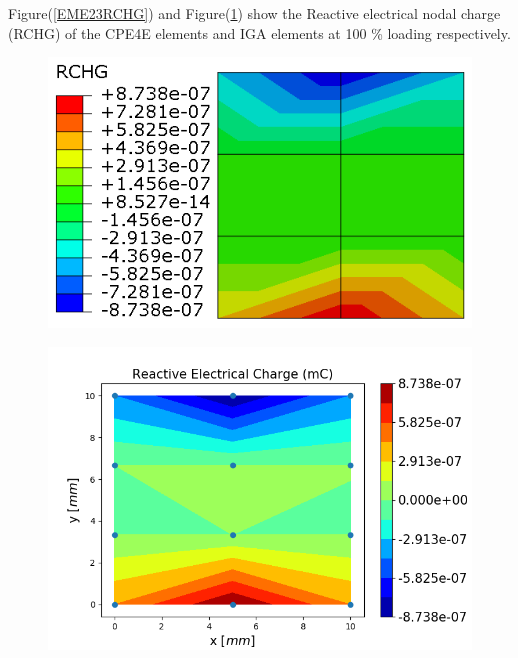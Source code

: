 \documentclass[12pt]{article}
\begin{document}
Figure(\ref{EME23RCHG}) and Figure(\ref{EME23RCHG_IGA}) show the Reactive electrical nodal charge (RCHG) of the CPE4E elements and IGA elements at 100 \% loading respectively. \\
\begin{figure}[H]
	\centering
	\begin{minipage}{.5\textwidth}
		\centering
		\includegraphics[width=1\linewidth]{EME23RCHG.png}
		\label{EME23RCHG}
	\end{minipage}%
	\begin{minipage}{.6\textwidth}
		\centering
		\includegraphics[width=1\linewidth]{EME23RCHG_IGA.png}
		\label{EME23RCHG_IGA}
	\end{minipage}
\end{figure}
\end{document}
